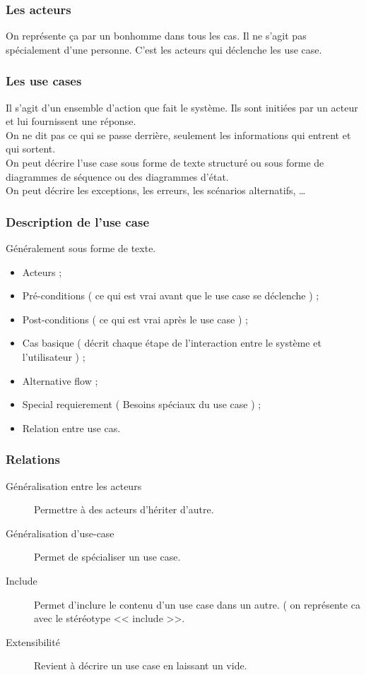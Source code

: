 \subsubsection{Les acteurs}
On représente ça par un bonhomme dans tous les cas. Il ne s’agit pas spécialement d’une personne. C’est les acteurs qui déclenche les use case.



\subsubsection{Les use cases}
Il s’agit d’un ensemble d’action que fait le système. Ils sont initiées par un acteur et lui fournissent une réponse.
\\On ne dit pas ce qui se passe derrière, seulement les informations qui entrent et qui sortent.
\\On peut décrire l’use case sous forme de texte structuré ou sous forme de diagrammes de séquence ou des diagrammes d’état.
\\On peut décrire les exceptions, les erreurs, les scénarios alternatifs, …


\subsubsection{Description de l’use case}
Généralement sous forme de texte.
\begin{itemize}
	\item Acteurs ;
	\item Pré-conditions ( ce qui est vrai avant que le use case se déclenche ) ;
	\item Post-conditions ( ce qui est vrai après le use case ) ;
	\item Cas basique ( décrit chaque étape de l’interaction entre le système et l’utilisateur ) ;
	\item Alternative flow ;
	\item Special requierement ( Besoins spéciaux du use case ) ;
	\item Relation entre use cas.
\end{itemize}



\subsubsection{Relations}
\begin{description}
	\item [Généralisation entre les acteurs] Permettre à des acteurs d’hériter d’autre.
	\item [Généralisation d’use-case] Permet de spécialiser un use case.
	\item [Include] Permet d’inclure le contenu d’un use case dans un autre. ( on représente ca avec le stéréotype << include >>.
	\item [Extensibilité] Revient à décrire un use case en laissant un vide.
\end{description}



